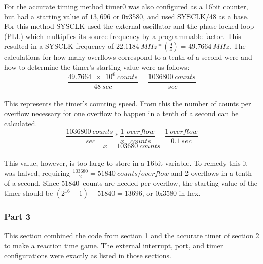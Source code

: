 \documentclass[12pt]{article}
\begin{document}
For the accurate timing method timer0 was also configured as a 16bit counter, but had a starting value of $13,696$ or 0x3580, and used SYSCLK/48 as a base. For this method SYSCLK used the external oscillator and the phase-locked loop (PLL) which multiplies its source frequency by a programmable factor. This resulted in a SYSCLK frequency of \begin{math}
	\SI{22.1184}{MHz}*\left(\frac{9}{4}\right) = \SI{49.7664}{MHz}
\end{math}.  The calculations for how many overflows correspond to a tenth of a second were and how to determine the timer's starting value were as follows:\\
\begin{equation}
	\frac{\SI{49.7664e6}{counts}}{\SI{48}{sec}} = \frac{\SI{1036800}{counts}}{\SI{}{sec}}
\end{equation}\\
This represents the timer's counting speed. From this the number of counts per overflow necessary for one overflow to happen in a tenth of a second can be calculated.\\
\begin{equation}
	\frac{\SI{1036800}{counts}}{\SI{}{sec}}*\frac{1}{x}\frac{\SI{}{overflow}}{\SI{}{counts}} = \frac{\SI{1}{overflow}}{\SI{0.1}{sec}}
\end{equation}
\begin{equation}
 x = \SI{103680}{counts}
\end{equation}\\
This value, however, is too large to store in a 16bit variable. To remedy this it was halved, requiring \begin{math}
	\frac{103680}{2} = \SI{51840}{counts\per overflow}
\end{math} and 2 overflows in a tenth of a second. Since \SI{51840}{counts} are needed per overflow, the starting value of the timer should be \begin{math}
(2^{16}-1)-51840 = 13696
\end{math}, or 0x3580 in hex.

\subsubsection{Part 3}
This section combined the code from section 1 and the accurate timer of section 2 to make a reaction time game. The external interrupt, port, and timer configurations were exactly as listed in those sections.
\end{document}
